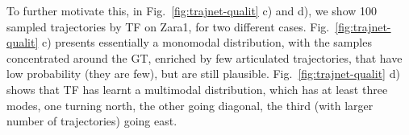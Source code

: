 \documentclass[a4paper,conference]{IEEEtran}
\begin{document}
To further motivate this, in Fig.~\ref{fig:trajnet-qualit} c) and d), we show 100 sampled trajectories by TF on Zara1, for two different cases. Fig.~\ref{fig:trajnet-qualit} c)  presents essentially a monomodal distribution, with the samples concentrated around the GT, enriched by few articulated trajectories, that have low probability (they are few), but are still plausible.  Fig.~\ref{fig:trajnet-qualit} d) shows that TF has learnt a multimodal distribution, which has at least three modes, one turning north, the other going diagonal, the third (with larger number of trajectories) going east.
\end{document}
